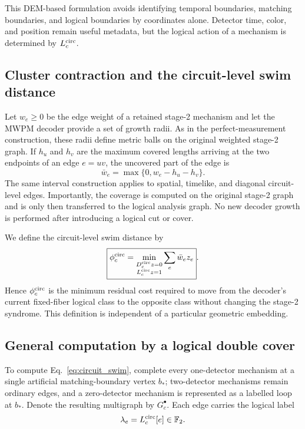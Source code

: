 \documentclass[10pt,twocolumn]{article}
\newcommand{\F}{\mathbb F_2}
\begin{document}
This DEM-based formulation avoids identifying temporal boundaries, matching
boundaries, and logical boundaries by coordinates alone.  Detector time,
color, and position remain useful metadata, but the logical action of a
mechanism is determined by \(L_c^{\rm circ}\).

\subsection{Cluster contraction and the circuit-level swim distance}

Let \(w_e\geq0\) be the edge weight of a retained stage-2 mechanism and let
the MWPM decoder provide a set of growth radii.  As in the
perfect-measurement construction, these radii define metric balls on the
original weighted stage-2 graph.  If \(h_u\) and \(h_v\) are the maximum
covered lengths arriving at the two endpoints of an edge
\(e=uv\), the uncovered part of the edge is
\[
 \bar w_e=\max\{0,w_e-h_u-h_v\}.
 \label{eq:residual_weight}
\]
The same interval construction applies to spatial, timelike, and diagonal
circuit-level edges.  Importantly, the coverage is computed on the original
stage-2 graph and is only then transferred to the logical analysis graph.
No new decoder growth is performed after introducing a logical cut or cover.

We define the circuit-level swim distance by
\[
 \boxed{
 \phi_c^{\rm circ}
 =
 \min_{\substack{
 D_c^{\rm circ}z=0\\
 L_c^{\rm circ}z=1
 }}
 \sum_{e}\bar w_e z_e
 }.
 \label{eq:circuit_swim}
\]
Hence \(\phi_c^{\rm circ}\) is the minimum residual cost required to move
from the decoder's current fixed-fiber logical class to the opposite class
without changing the stage-2 syndrome.  This definition is independent of a
particular geometric embedding.

\subsection{General computation by a logical double cover}

To compute Eq.~\eqref{eq:circuit_swim}, complete every one-detector
mechanism at a single artificial matching-boundary vertex \(b_\ast\);
two-detector mechanisms remain ordinary edges, and a zero-detector mechanism
is represented as a labelled loop at \(b_\ast\).  Denote the resulting
multigraph by \(G_c^\bullet\).  Each edge carries the logical label
\[
 \lambda_e=L_c^{\rm circ}[e]\in\F.
\]
\end{document}
